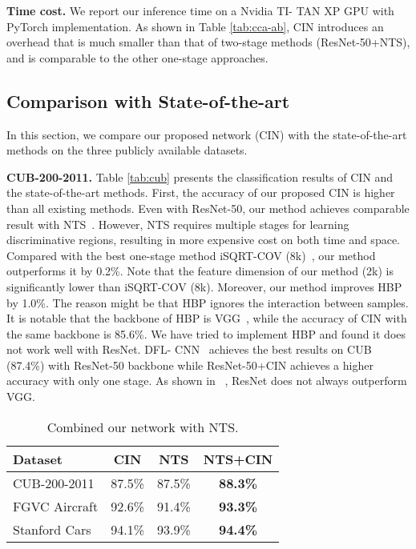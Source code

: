 \documentclass[letterpaper]{article} \usepackage{aaai20}  \usepackage{times}  \usepackage{helvet} \usepackage{courier}  \usepackage[hyphens]{url}  \usepackage{graphicx} \urlstyle{rm} \def\UrlFont{\rm}  \usepackage{graphicx}  \frenchspacing  \setlength{\pdfpagewidth}{8.5in}  \setlength{\pdfpageheight}{11in}  \usepackage{amsmath,amssymb}
\begin{document}
\textbf{Time cost.} We report our inference time on a Nvidia TI-
TAN XP GPU with PyTorch implementation. As shown in Table \ref{tab:cca-ab}, CIN introduces an overhead that is much smaller than that of two-stage methods (ResNet-50+NTS), and is comparable to the other one-stage approaches.

\subsection{Comparison with State-of-the-art}
In this section, we compare our proposed network (CIN) with the state-of-the-art methods on the three publicly available datasets.

\textbf{CUB-200-2011.} Table \ref{tab:cub} presents the classification results of CIN and the state-of-the-art methods.
First, the accuracy of our proposed CIN is higher than all existing methods. Even with ResNet-50, our method achieves comparable result with NTS~\cite{yang2018learning}. However, NTS requires multiple stages for learning discriminative regions, resulting in more expensive cost on both time and space.
Compared with the best one-stage method iSQRT-COV (8k)~\cite{DBLP:conf/cvpr/LiXWG18}, our method outperforms it by 0.2\%. Note that the feature dimension of our method (2k) is significantly lower than iSQRT-COV (8k).
Moreover, our method improves HBP~\cite{yu2018hierarchical} by 1.0\%. The reason might be that HBP ignores the interaction between samples. It is notable that the backbone of HBP is VGG~\cite{simonyan2014very}, while the accuracy of CIN with the same backbone is 85.6\%. We have tried to implement HBP and found it does not work well with ResNet. DFL-
CNN~\cite{wang2018learning} achieves the best results on CUB (87.4\%) with ResNet-50 backbone while ResNet-50+CIN achieves a higher
accuracy with only one stage. As shown in ~\cite{wang2018learning}, ResNet
does not always outperform VGG.

\begin{table}
\begin{center}
\begin{tabular}{|l|c|c|c|}
\hline
Dataset & CIN & NTS & NTS+CIN \\
\hline\hline
CUB-200-2011 & 87.5\% & 87.5\% & \textbf{88.3\%}\\
FGVC Aircraft & 92.6\% & 91.4\% & \textbf{93.3\%}\\
Stanford Cars & 94.1\% & 93.9\% & \textbf{94.4\%}\\
\hline
\end{tabular}
\end{center}
\caption{Combined our network with NTS.}
\label{tab:nts-ab}
\end{table}
\end{document}
